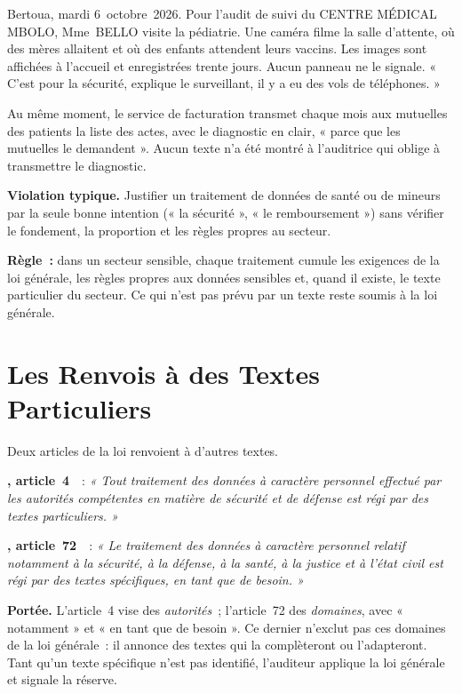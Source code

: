 Bertoua, mardi 6~octobre~2026. Pour l'audit de suivi du CENTRE MÉDICAL
MBOLO, Mme~BELLO visite la pédiatrie. Une caméra filme la salle d'attente,
où des mères allaitent et où des enfants attendent leurs vaccins. Les images
sont affichées à l'accueil et enregistrées trente jours. Aucun panneau ne
le signale. « C'est pour la sécurité, explique le surveillant, il y a eu des
vols de téléphones. »

Au même moment, le service de facturation transmet chaque mois aux
mutuelles des patients la liste des actes, avec le diagnostic en clair,
« parce que les mutuelles le demandent ». Aucun texte n'a été montré à
l'auditrice qui oblige à transmettre le diagnostic.

\begin{boxalert}
\textbf{Violation typique.} Justifier un traitement de données de santé ou de
mineurs par la seule bonne intention (« la sécurité », « le remboursement »)
sans vérifier le fondement, la proportion et les règles propres au secteur.

\smallskip
\textbf{Règle~:} dans un secteur sensible, chaque traitement cumule les
exigences de la loi générale, les règles propres aux données sensibles et,
quand il existe, le texte particulier du secteur. Ce qui n'est pas prévu
par un texte reste soumis à la loi générale.
\end{boxalert}

\section{Les Renvois à des Textes Particuliers}
\label{sec:c15-renvois}

Deux articles de la loi renvoient à d'autres textes.

\begin{boxjuris}
\textbf{, article~4}~\cite{loi2024017}~:
\textit{« Tout traitement des données à caractère personnel effectué par les
autorités compétentes en matière de sécurité et de défense est régi par
des textes particuliers. »}

\medskip
\textbf{, article~72}~\cite{loi2024017}~:
\textit{« Le traitement des données à caractère personnel relatif notamment
à la sécurité, à la défense, à la santé, à la justice et à l'état civil est
régi par des textes spécifiques, en tant que de besoin. »}

\smallskip
\textbf{Portée.} L'article~4 vise des \textit{autorités}~; l'article~72 des
\textit{domaines}, avec « notamment » et « en tant que de besoin ». Ce
dernier n'exclut pas ces domaines de la loi générale~: il annonce des
textes qui la complèteront ou l'adapteront. Tant qu'un texte spécifique
n'est pas identifié, l'auditeur applique la loi générale et signale la
réserve.
\end{boxjuris}

